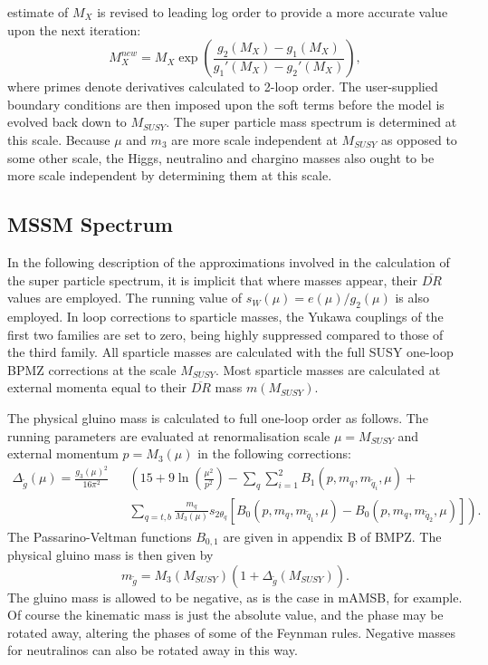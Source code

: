 \documentclass{article}
\begin{document}
estimate of $M_X$ is revised to leading log order 
to provide a more accurate value upon
the next iteration:
\begin{equation}
M_X^{new} = M_X \exp \left({\frac{g_2(M_X) - g_1(M_X)}{g_1'(M_X) - g_2'(M_X)}}\right),
\label{mguteq}
\end{equation}
where primes denote derivatives calculated to 2-loop order.
The user-supplied boundary
conditions are then imposed upon the soft terms before the model is evolved
back down to $M_{SUSY}$. The super particle mass spectrum is determined at this
scale. Because $\mu$ and $m_3$ are 
more scale independent at $M_{SUSY}$ as opposed to some other scale, the Higgs,
neutralino and chargino masses also ought to be more scale independent 
by determining them at this scale. 

\subsection{MSSM Spectrum}

In the following description of the approximations involved in the calculation
of the super particle spectrum, it is implicit that where masses
appear, their $\overline{DR}$ values 
are employed. The running value of
$s_W(\mu)=e(\mu) / g_2(\mu)$ is also employed.
In loop corrections to sparticle masses, the Yukawa couplings of the first two
families are set to zero, being highly suppressed compared to those of the
third family. 
All sparticle masses are calculated with the full SUSY one-loop BPMZ
corrections at the scale $M_{SUSY}$. Most sparticle masses are
calculated at external momenta equal to their $\overline{DR}$ mass
$m(M_{SUSY})$. 

The physical gluino mass is calculated to full one-loop order as follows.
The running parameters are evaluated at renormalisation scale 
$\mu=M_{SUSY}$ and external momentum 
$p=M_3(\mu)$ in the following corrections:
\begin{eqnarray}
\Delta_{\tilde g} (\mu) = \frac{g_3(\mu)^2}{16 \pi^2} &&
\left( 15 + 9 \ln \left( \frac{\mu^2}{p^2} \right) - \sum_q \sum_{i=1}^2
B_1(p, m_q, m_{\tilde q_i}, \mu) + \right. \nonumber \\
&& \left. 
\sum_{q=t,b} \frac{m_q}{M_3(\mu)} s_{2 \theta_q} \left[ B_0(p, m_q, m_{\tilde
q_1}, \mu) - 
B_0(p, m_q, m_{\tilde q_2}, \mu) \right] 
\right).
\end{eqnarray}
The Passarino-Veltman functions $B_{0,1}$ are given in appendix B of BMPZ\@.
The physical gluino mass is then given by
\begin{equation}
m_{\tilde g} = M_3(M_{SUSY}) \left(1 + \Delta_{\tilde g} (M_{SUSY})\right). 
\label{glumass}
\end{equation}
The gluino mass
is allowed to be negative, as is the case in mAMSB, for example. Of course the
kinematic mass is just the absolute value, and the phase may be rotated away,
altering the phases of some of the Feynman rules. Negative masses for
neutralinos can also be rotated away in this way.
\end{document}
